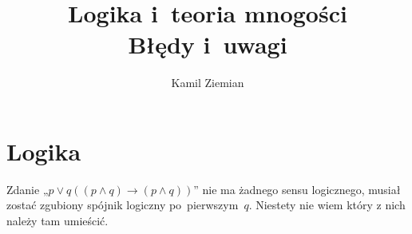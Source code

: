 \documentclass[a4paper,11pt]{article}
\title{Logika i~teoria mnogości \\
  Błędy i~uwagi}
\author{Kamil Ziemian}
\begin{document}





\maketitle  %





\section{Logika}

\vspace{\spaceTwo}







\start {} Zdanie
„$p \vee q ( ( p \land q ) \to ( p \land q ) )$” nie ma żadnego sensu
logicznego, musiał zostać zgubiony spójnik logiczny po~pierwszym~$q$.
Niestety nie wiem który z nich należy tam umieścić.





\end{document}
